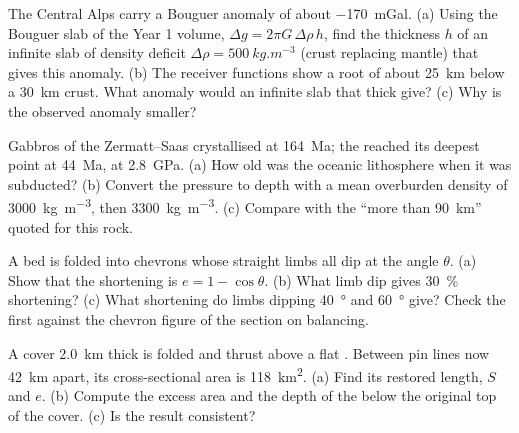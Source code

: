 \begin{exercise}[$\star\star$]\label{exo:b2:alpine-orogen:5}
The Central Alps carry a Bouguer anomaly of about \qty{-170}{mGal}. (a) Using the Bouguer
slab of the Year 1 volume, $\Delta g = 2\pi G\,\Delta\rho\,h$, find the thickness $h$ of an
infinite slab of density deficit $\Delta\rho = \qty{500}{kg.m^{-3}}$ (crust replacing mantle)
that gives this anomaly. (b) The receiver functions show a root of about \qty{25}{km} below a
\qty{30}{km} crust. What anomaly would an infinite slab that thick give? (c) Why is the
observed anomaly smaller?
\end{exercise}

\begin{exercise}[$\star\star$]\label{exo:b2:alpine-orogen:6}
Gabbros of the Zermatt--Saas  crystallised at \qty{164}{Ma}; the  reached
its deepest point at \qty{44}{Ma}, at \qty{2.8}{GPa}. (a) How old was the oceanic
lithosphere when it was subducted? (b) Convert the pressure to depth with a mean overburden
density of \qty{3000}{kg.m^{-3}}, then \qty{3300}{kg.m^{-3}}. (c) Compare with the
``more than \qty{90}{km}'' quoted for this rock.
\end{exercise}

\begin{exercise}[$\star\star$]\label{exo:b2:alpine-orogen:7}
A bed is folded into chevrons whose straight limbs all dip at the angle $\theta$.
(a) Show that the shortening is $e = 1 - \cos\theta$. (b) What limb dip gives
\qty{30}{\percent} shortening? (c) What shortening do limbs dipping \qty{40}{\degree} and
\qty{60}{\degree} give? Check the first against the chevron figure of the section on balancing.
\end{exercise}

\begin{exercise}[$\star\star$]\label{exo:b2:alpine-orogen:8}
A cover \qty{2.0}{km} thick is folded and thrust above a flat . Between pin lines
now \qty{42}{km} apart, its cross-sectional area is \qty{118}{km^2}. (a) Find its restored
length, $S$ and $e$. (b) Compute the excess area and the depth of the  below the
original top of the cover. (c) Is the result consistent?
\end{exercise}

